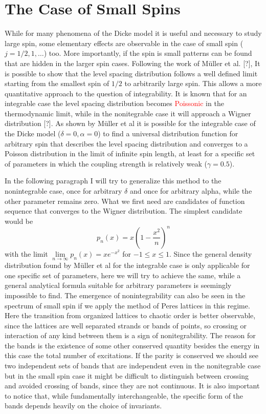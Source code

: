 \section{The Case of Small Spins}
While for many phenomena of the Dicke model it is useful and necessary to study large spin, some elementary effects are observable in the case of small spin ($j= 1/2, 1 ,\dots$) too.
More importantly, if the spin is small patterns can be found that are hidden in the larger spin cases.
Following the work of Müller et al. [?], It is possible to show that the level spacing distribution follows a well defined limit starting from the smallest spin of $1/2$ to arbitrarily large spin.
This allows a more quantitative approach to the question of integrability.
It is known that for an integrable case the level spacing distribution becomes \textcolor{red}{Poissonic} in the thermodynamic limit, while in the nonitegrable case it will approach a Wigner distribution [?].
As shown by Müller et al it is possible for the integrable case of the Dicke model ($\delta = 0, \alpha = 0$) to find a universal distribution function for arbitrary spin that describes the level spacing distribution and converges to a Poisson distribution in the limit of infinite spin length, at least for a specific set of parameters in which the coupling strength is relatively weak ($\gamma = 0.5$).

In the following paragraph I will try to generalize this method to the nonintegrable case, once for arbitrary $\delta$ and once for arbitrary alpha, while the other parameter remains zero.
What we first need are candidates of function sequence that converges to the Wigner distribution.
The simplest candidate would be
\begin{equation}
	p_n(x) = x \left(1-\frac{x^2}{n}\right)^n
\end{equation}
with the limit $\lim\limits_{n\rightarrow \infty} p_n(x) = x e^{-x^2}$ for $-1 \leq x \leq 1$.
Since the general density distribution found by Müller et al for the integrable case is only applicable for one specific set of parameters, here we will try to achieve the same, while a general analytical formula suitable for arbitrary parameters is seemingly impossible to find.
The emergence of nonintegrability can also be seen in the spectrum of small spin if we apply the method of Peres lattices in this regime.
Here the transition from organized lattices to chaotic order is better observable, since the lattices are well separated strands or bands of points, so crossing or interaction of any kind between them is a sign of nonitegrability.
The reason for the bands is the existence of some other conserved quantity besides the energy in this case the total number of excitations. 
If the parity is conserved we should see two independent sets of bands that are independent even in the nonitegrable case but in the small spin case it might be difficult to distinguish between crossing and avoided crossing of bands, since they are not continuous. 
It is also important to notice that, while fundamentally interchangeable, the specific form of the bands depends heavily on the choice of invariants.


